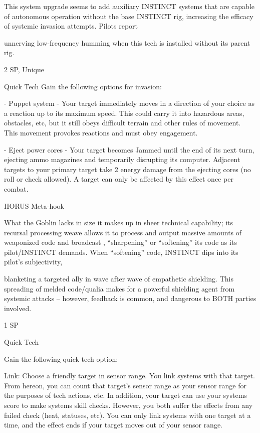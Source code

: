 This system upgrade seems to add auxiliary INSTINCT systems that are capable of autonomous operation
without the base INSTINCT rig, increasing the efficacy of systemic invasion attempts. Pilots report

unnerving low-frequency humming when this tech is installed without its parent rig.

2 SP, Unique

Quick Tech
Gain the following options for invasion:

     -   Puppet system - Your target immediately moves in a direction of your choice as a
         reaction up to its maximum speed. This could carry it into hazardous areas, obstacles,
         etc, but it still obeys difficult terrain and other rules of movement. This movement
         provokes reactions and must obey engagement.

     -   Eject power cores - Your target becomes Jammed until the end of its next turn, ejecting
         ammo magazines and temporarily disrupting its computer. Adjacent targets to your
         primary target take 2 energy damage from the ejecting cores (no roll or check allowed). A
         target can only be affected by this effect once per combat.


HORUS Meta-hook




What the Goblin lacks in size it makes up in sheer technical capability; its recursal processing weave allows
it to process and output massive amounts of weaponized code and broadcast , “sharpening” or “softening”
its code as its pilot/INSTINCT demands. When “softening” code, INSTINCT dips into its pilot’s subjectivity,

blanketing a targeted ally in wave after wave of empathetic shielding. This spreading of melded code/qualia
makes for a powerful shielding agent from systemic attacks -- however, feedback is common, and
dangerous to BOTH parties involved.

1 SP

Quick Tech

Gain the following quick tech option:

         Link: Choose a friendly target in sensor range. You link systems with that target. From
         hereon, you can count that target’s sensor range as your sensor range for the purposes of
        tech actions, etc. In addition, your target can use your systems score to make systems
        skill checks. However, you both suffer the effects from any failed check (heat, statuses,
        etc). You can only link systems with one target at a time, and the effect ends if your target
         moves out of your sensor range.



